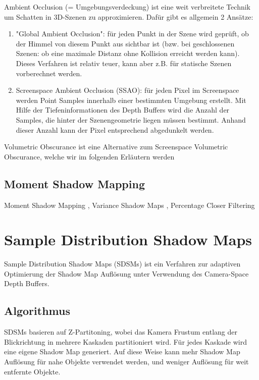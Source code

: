 \documentclass[runningheaders,a4paper]{llncs}
\begin{document}
Ambient Occlusion (= Umgebungsverdeckung) ist eine weit verbreitete Technik um Schatten in 3D-Szenen
zu approximieren. Dafür gibt es allgemein 2 Ansätze:
\begin{enumerate}
	\item "Global Ambient Occlusion": für jeden Punkt in der Szene wird geprüft, ob der Himmel von diesem
		Punkt aus sichtbar ist (bzw. bei geschlossenen Szenen: ob eine maximale Distanz ohne Kollision erreicht
		 werden kann). Dieses Verfahren ist relativ teuer, kann aber z.B. für statische Szenen vorberechnet
		 werden.
		\cite{aoPaper}
	\item Screenspace Ambient Occlusion (SSAO): für jeden Pixel im Screenspace werden Point Samples
		innerhalb einer bestimmten Umgebung erstellt. Mit Hilfe der Tiefeninformationen des Depth Buffers
		wird die Anzahl der Samples, die hinter der Szenengeometrie liegen müssen bestimmt. Anhand dieser Anzahl
		kann der Pixel entsprechend abgedunkelt werden.  \cite{cry2Paper}
\end{enumerate}  
Volumetric Obscurance ist eine Alternative zum Screenspace Volumetric Obscurance, welche wir im folgenden
Erläutern werden

\cite{loos2010volumetric}

\subsection{Moment Shadow Mapping}

Moment Shadow Mapping \cite{msm}, Variance Shadow Maps \cite{donnelly2006variance}, Percentage Closer Filtering \cite{reeves1987rendering}



\section{Sample Distribution Shadow Maps}

Sample Distribution Shadow Maps (SDSMs) ist ein Verfahren zur adaptiven Optimierung der Shadow Map Auflösung unter Verwendung des Camera-Space Depth Buffers.

\subsection{Algorithmus}

SDSMs basieren auf Z-Partitoning, wobei das Kamera Frustum entlang der Blickrichtung in mehrere Kaskaden partitioniert wird. Für jedes Kaskade wird eine eigene Shadow Map generiert.
Auf diese Weise kann mehr Shadow Map Auflösung für nahe Objekte verwendet werden, und weniger Auflösung für weit entfernte Objekte.
\end{document}
